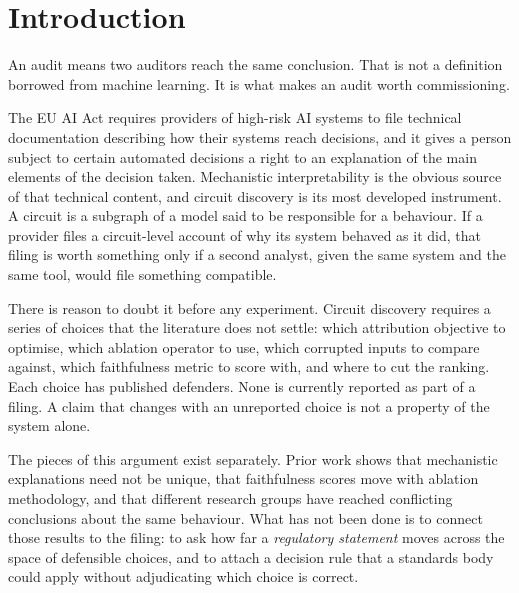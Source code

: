 \documentclass[letterpaper]{article} %
\begin{document}
\section{Introduction}

An audit means two auditors reach the same conclusion. That is not a definition
borrowed from machine learning. It is what makes an audit worth commissioning.

The EU AI Act \citep{aiact2024} requires providers of high-risk AI systems to
file technical documentation describing how their systems reach decisions, and
it gives a person subject to certain automated decisions a right to an
explanation of the main elements of the decision taken. Mechanistic interpretability is the obvious
source of that technical content, and circuit discovery is its most developed
instrument. A circuit is a subgraph of a model said to be responsible for a
behaviour. If a provider files a circuit-level account of why its system behaved
as it did, that filing is worth something only if a second analyst, given the
same system and the same tool, would file something compatible.

There is reason to doubt it before any experiment. Circuit discovery requires a
series of choices that the literature does not settle: which attribution
objective to optimise, which ablation operator to use, which corrupted inputs to
compare against, which faithfulness metric to score with, and where to cut the
ranking. Each choice has published defenders. None is currently reported as part
of a filing. A claim that changes with an unreported choice is not a property of
the system alone.

The pieces of this argument exist separately. Prior work shows that mechanistic
explanations need not be unique, that faithfulness scores move with ablation
methodology, and that different research groups have reached conflicting
conclusions about the same behaviour. What has not been done is to connect those
results to the filing: to ask how far a \emph{regulatory statement} moves across
the space of defensible choices, and to attach a decision rule that a standards
body could apply without adjudicating which choice is correct.
\end{document}

